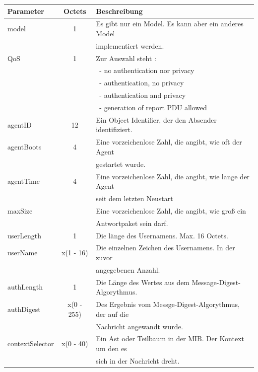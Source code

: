 \documentclass[11pt,a4paper]{article}
\begin{document}
\begin{tabular}{| l | c | l |}
	\hline
	\rowcolor{lgray}
	Parameter			& Octets	&		Beschreibung\\
	\hline
	model					&		1		&		Es gibt nur ein Model. Es kann aber ein anderes Model\\
								&				&		implementiert werden.\\
	\hline
	QoS						&		1		&		Zur Auswahl steht :\\
								&				&		\ - no authentication nor privacy\\
								&				&		\ - authentication, no privacy\\
								&				&		\ - authentication and privacy\\
								&				&		\ - generation of report PDU allowed\\
	\hline
	agentID				&		12	&		Ein Object Identifier, der den Absender identifiziert.\\
	\hline
	agentBoots			&		4		&		Eine vorzeichenlose Zahl, die angibt, wie oft der Agent\\
								&				&		gestartet wurde.\\
	\hline
	agentTime			&		4		&		Eine vorzeichenlose Zahl, die angibt, wie lange der Agent\\
								&				&		seit dem letzten Neustart \\
	\hline
	maxSize				&				&		Eine vorzeichenlose Zahl, die angibt, wie groß ein\\
								&				&		Antwortpaket sein darf.\\
	\hline
	userLength			&		1		&		Die länge des Usernamens. Max. 16 Octets.\\
	\hline
	userName				& x(1 - 16)&	Die einzelnen Zeichen des Usernamens. In der zuvor\\
								&				&		angegebenen Anzahl.\\
	\hline
	authLength			&		1		&		Die Länge des Wertes aus dem Message-Digest-Algorythmus.\\
	\hline
	authDigest			&x(0 - 255)&	Des Ergebnis vom Messge-Digest-Algorythmus, der auf die\\
								&				&		Nachricht angewandt wurde.\\
	\hline
	contextSelector	&x(0 - 40)&		Ein Ast oder Teilbaum in der MIB. Der Kontext um den es\\
								&				&		sich in der Nachricht dreht.\\
	\hline
\end{tabular}
\\
\emptyline
\end{document}
